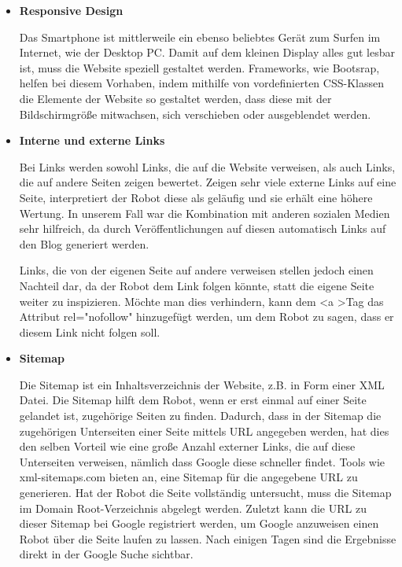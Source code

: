 {\begin{itemize}
      \item \textbf{Responsive Design}

        Das Smartphone ist mittlerweile ein ebenso beliebtes Gerät zum Surfen im Internet, wie der Desktop PC. Damit auf dem kleinen Display alles gut lesbar ist, muss die Website speziell
        gestaltet werden. Frameworks, wie Bootsrap, helfen bei diesem Vorhaben, indem mithilfe von vordefinierten CSS-Klassen die Elemente der Website so gestaltet werden, dass diese mit der
        Bildschirmgröße mitwachsen, sich verschieben oder ausgeblendet werden.

      \item \textbf{Interne und externe Links}

        Bei Links werden sowohl Links, die auf die Website verweisen, als auch Links, die auf andere Seiten zeigen bewertet.
        Zeigen sehr viele externe Links auf eine Seite, interpretiert der Robot diese als geläufig und sie erhält eine höhere Wertung. In unserem Fall war die Kombination mit anderen sozialen
        Medien sehr hilfreich, da durch Veröffentlichungen auf diesen automatisch Links auf den Blog generiert werden.

        Links, die von der eigenen Seite auf andere verweisen stellen jedoch einen Nachteil dar, da der Robot dem Link folgen könnte, statt die eigene Seite weiter zu inspizieren. Möchte man dies
        verhindern, kann dem \textless a \textgreater Tag das Attribut rel="nofollow" hinzugefügt werden, um dem Robot zu sagen, dass er diesem Link nicht folgen soll.

      \item \textbf{Sitemap}

      	Die Sitemap ist ein Inhaltsverzeichnis der Website, z.B. in Form einer XML Datei. Die Sitemap hilft dem Robot, wenn er erst einmal auf einer Seite gelandet ist, zugehörige Seiten
        zu finden. Dadurch, dass in der Sitemap die zugehörigen Unterseiten einer Seite mittels URL angegeben werden, hat dies den selben Vorteil wie eine große Anzahl externer Links, die auf diese
        Unterseiten verweisen, nämlich dass Google diese schneller findet. Tools wie xml-sitemaps.com bieten an, eine Sitemap für die angegebene URL zu generieren. Hat der Robot die Seite vollständig
        untersucht, muss die Sitemap im Domain Root-Verzeichnis abgelegt werden. Zuletzt kann die URL zu dieser Sitemap bei Google registriert werden, um Google anzuweisen einen Robot über die Seite
        laufen zu lassen. Nach einigen Tagen sind die Ergebnisse direkt in der Google Suche sichtbar.


\end{itemize}}
